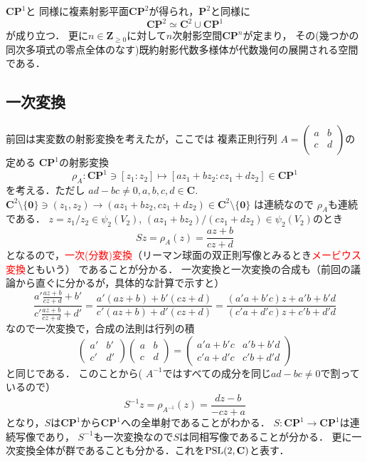$\mathbf C\mathbf P^1$と
同様に複素射影平面$\mathbf C\mathbf P^2$が得られ，$\mathbf P^2$と同様に
\[
	\mathbf C\mathbf P^2
	\simeq  \mathbf C^2 \cup \mathbf C\mathbf P^1
\]
が成り立つ．
更に$n\in \mathbf Z_{\ge 0}$に対して$n$次射影空間$\mathbf C\mathbf P^n$が定まり，
その(幾つかの同次多項式の零点全体のなす)既約射影代数多様体が代数幾何の展開される空間である．

\subsection{一次変換}
前回は実変数の射影変換を考えたが，ここでは
複素正則行列
$A=\begin{pmatrix}
    	    	a&b\\
    		c&d\\
 	\end{pmatrix}$の定める
$ \mathbf C\mathbf P^1$の射影変換
\[
	\rho_A:\mathbf C\mathbf P^1\ni [z_1:z_2]\mapsto
	[az_1+bz_2:c z_1+d z_2]\in \mathbf C\mathbf P^1
\]
を考える．ただし $ad-bc\neq 0, a,b,c,d \in \mathbf C$. 
$\mathbf C^2\setminus\{\mathbf 0\}\ni (z_1,z_2)\to 
(az_1+bz_2, c z_1+d z_2)\in \mathbf C^2\setminus\{\mathbf 0\}$ は連続なので
$\rho_A$も連続である．
$z=z_1/z_2\in \psi_2(V_2)$,
$(az_1+bz_2)/(c z_1+d z_2)\in \psi_2(V_2)$のとき
\begin{equation}\label{linearTrans}
	Sz =\rho_A(z)  = \frac{a z +b}{c z +d}
\end{equation}
となるので，\textcolor{red}{一次(分数)変換}（リーマン球面の双正則写像とみるとき\textcolor{red}{メービウス変換}ともいう）
であることが分かる．
一次変換と一次変換の合成も（前回の議論から直ぐに分かるが，具体的な計算で示すと）
\[
	 \frac{a'  \frac{a z +b}{c z +d} +b'}{c ' \frac{a z +b}{c z +d} +d'} 
	 =
	 \frac{a'  (a z +b)+b'(c z +d)}{c '  (a z +b) +d'(c z +d)} 
	 =
	 \frac{(a' a+ b' c)z +a'b+b' d}{(c ' a+ d'c)z +c 'b +d'd} 
\]
なので一次変換で，合成の法則は行列の積
\[
	\begin{pmatrix}
		a' & b'\\
		c' & d'
	\end{pmatrix}
	\begin{pmatrix}
		a & b\\
		c & d
	\end{pmatrix}
	=
	\begin{pmatrix}
		a'a +b'c & a'b+b'd\\
		c'a+d'c & c'b+d'd
	\end{pmatrix}
\]
と同じである．
このことから( $A^{-1}$ではすべての成分を同じ$ad-bc\neq 0$で割っているので）
\[
	S^{-1} z =\rho_{A^{-1}}(z)  = \frac{d z -b}{-c z +a}
\]
となり，$S$は$\mathbf C\mathbf P^1$から$\mathbf C\mathbf P^1$への全単射であることがわかる．
$S:\mathbf C\mathbf P^1\to\mathbf C\mathbf P^1$は連続写像であり，
$S^{-1}$も一次変換なので$S$は同相写像であることが分かる．
更に一次変換全体が群であることも分かる．これを$\operatorname{PSL}(2,\mathbf C)$と表す．

